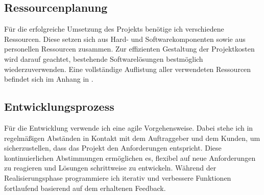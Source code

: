 \subsection{Ressourcenplanung}
Für die erfolgreiche Umsetzung des Projekts benötige ich verschiedene Ressourcen.
Diese setzen sich aus Hard- und Softwarekomponenten sowie aus personellen Ressourcen zusammen.
Zur effizienten Gestaltung der Projektkosten wird darauf geachtet, bestehende Softwarelösungen bestmöglich wiederzuverwenden.
Eine vollständige Auflistung aller verwendeten Ressourcen befindet sich im Anhang in .

\subsection{Entwicklungsprozess}
Für die Entwicklung verwende ich eine agile Vorgehensweise.
Dabei stehe ich in regelmäßigen Abständen in Kontakt mit dem Auftraggeber und dem Kunden, um sicherzustellen, dass das Projekt den Anforderungen entspricht.
Diese kontinuierlichen Abstimmungen ermöglichen es, flexibel auf neue Anforderungen zu reagieren und Lösungen schrittweise zu entwickeln.
Während der Realisierungsphase programmiere ich iterativ und verbessere Funktionen fortlaufend basierend auf dem erhaltenen Feedback.
